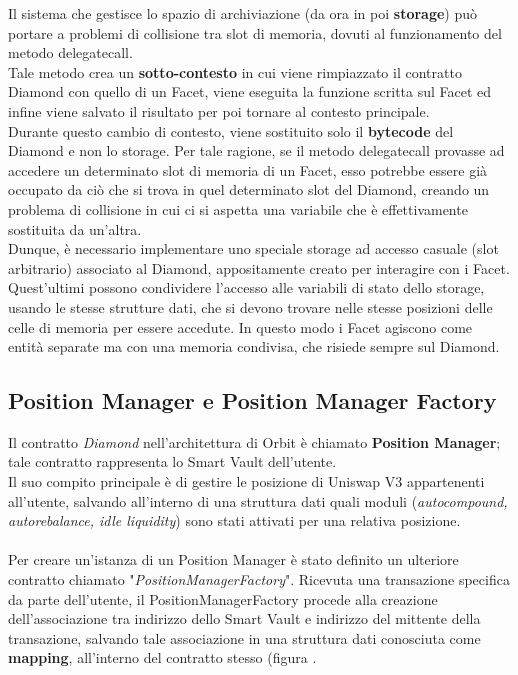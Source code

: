 \documentclass[12pt,a4paper]{report}
\begin{document}
\noindent Il sistema che gestisce lo spazio di archiviazione (da ora in poi \textbf{storage}) può portare a problemi di collisione tra slot di memoria, dovuti al funzionamento del metodo delegatecall.
\\Tale metodo crea un \textbf{sotto-contesto} in cui viene rimpiazzato il contratto Diamond con quello di un Facet, viene eseguita la funzione scritta sul Facet ed infine viene salvato il risultato per poi tornare al contesto principale. 
\\Durante questo cambio di contesto, viene sostituito solo il \textbf{bytecode} del Diamond e non lo storage. Per tale ragione, se il metodo delegatecall provasse ad accedere un determinato slot di memoria di un Facet, esso potrebbe essere già occupato da ciò che si trova in quel determinato slot del Diamond, creando un problema di collisione in cui ci si aspetta una variabile che è effettivamente sostituita da un'altra.\\Dunque, è necessario implementare uno speciale storage ad accesso casuale (slot arbitrario) associato al Diamond, appositamente creato per interagire con i Facet.
\\Quest'ultimi possono condividere l'accesso alle variabili di stato dello storage, usando le stesse strutture dati, che si devono trovare nelle stesse posizioni delle celle di memoria per essere accedute. In questo modo i Facet agiscono come entità separate ma con una memoria condivisa, che risiede sempre sul Diamond.





\subsection{Position Manager e Position Manager Factory}

Il contratto \textit{Diamond} nell'architettura di Orbit è chiamato \textbf{Position Manager}; tale contratto rappresenta lo Smart Vault dell'utente.\\Il suo compito principale è di gestire le posizione di Uniswap V3 appartenenti all'utente, salvando all'interno di una struttura dati quali moduli (\textit{autocompound, autorebalance, idle liquidity}) sono stati attivati per una relativa posizione.
\\\\Per creare un'istanza di un Position Manager è stato definito un ulteriore contratto chiamato "\textit{PositionManagerFactory}". Ricevuta una transazione specifica da parte dell'utente, il PositionManagerFactory procede alla creazione dell'associazione tra indirizzo dello Smart Vault e indirizzo del mittente della transazione, salvando tale associazione in una struttura dati conosciuta come \textbf{mapping}, all'interno del contratto stesso (figura . 
\end{document}
